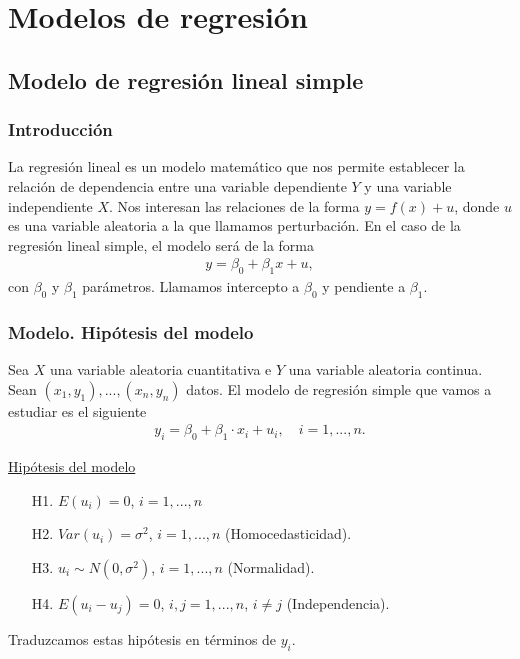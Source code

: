 \part{Modelos de regresión}

\chapter{Modelo de regresión lineal simple}

\section{Introducción}
\noindent La regresión lineal es un modelo matemático que nos permite establecer la relación de dependencia entre una variable dependiente $Y$ y una variable independiente $X$. Nos interesan las relaciones de la forma $y = f(x) + u$, donde $u$ es una variable aleatoria a la que llamamos perturbación.
En el caso de la regresión lineal simple, el modelo será de la forma 
\begin{align*}
    y = \beta_0 + \beta_1x + u,
\end{align*}
con $\beta_0$ y $\beta_1$ parámetros.
Llamamos intercepto a $\beta_0$ y pendiente a $\beta_1$.

\section{Modelo. Hipótesis del modelo}
\noindent Sea $X$ una variable aleatoria cuantitativa e $Y$ una variable aleatoria continua. Sean $(x_1,y_1),...,(x_n,y_n)$ datos. El modelo de regresión simple que vamos a estudiar es el siguiente
\begin{align*}
    y_i = \beta_0 + \beta_1 \cdot x_i + u_i, \quad i = 1,...,n.
\end{align*}

\noindent \underline{Hipótesis del modelo}

\begin{enumerate}
    \item[H1.] $E(u_i) = 0$, $i=1,...,n$
    \item[H2.] $Var(u_i) = \sigma^2$, $i=1,...,n$ (Homocedasticidad).
    \item[H3.] $u_i \sim N(0,\sigma^2)$, $i=1,...,n$ (Normalidad). 
    \item[H4.] $E(u_i - u_j) = 0$, $i,j=1,...,n$, $i \not = j$ (Independencia). 
\end{enumerate}
Traduzcamos estas hipótesis en términos de $y_i$.

